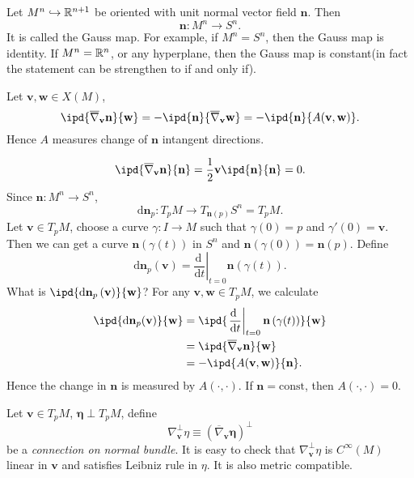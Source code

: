 \begin{example}
  Let $M^n\hookrightarrow \mathbb{R}^{n+1}$ be oriented with unit normal vector field $\mathbf{n}$. Then 
  \[
  \mathbf{n}:M^n\to S^n.
  \] 
  It is called the Gauss map. For example, if $M^n=S^n$,  then the Gauss map is identity. If $M^n=\mathbb{R}^n$, or any hyperplane, then the Gauss map is constant(in fact the statement can be strengthen to if and only if).

  Let $\mathbf{v},\mathbf{w}\in X(M)$,
  \[
    \ipd{\overline{\nabla }_{\mathbf{v}}\mathbf{n}}{\mathbf{w}}=-\ipd{\mathbf{n}}{\overline{\nabla }_{\mathbf{v}}\mathbf{w}}=-\ipd{\mathbf{n}}{A(\mathbf{v},\mathbf{w})}.
  \]
  Hence $A$ measures change of $\mathbf{n}$ intangent directions.

  \[
  \ipd{\overline{\nabla }_{\mathbf{v}}\mathbf{n}}{\mathbf{n}}=\frac{1}{2}\mathbf{v}\ipd{\mathbf{n}}{\mathbf{n}}=0.
  \]
Since $\mathbf{n}:M^n\to S^n$,
\[
  \mathrm{d}\mathbf{n}_p:T_pM\to T_{\mathbf{n}(p)}S^n= T_pM.
\]
Let $\mathbf{v}\in T_pM$, choose a curve $\gamma:I\to M$ such that $\gamma(0)=p$ and $\gamma'(0)=\mathbf{v}$. Then we can get a curve $\mathbf{n}\left( \gamma(t) \right) $ in $S^n$ and $\mathbf{n}(\gamma(0))=\mathbf{n}(p)$. Define
\[
  \mathrm{d}\mathbf{n}_p(\mathbf{v})=\left.\frac{\mathrm{d}~}{\mathrm{d}t}\right|_{t=0}\mathbf{n}\left( \gamma(t) \right) .
\] 
What is $\ipd{\mathrm{d}\mathbf{n}_p\left( \mathbf{v} \right) }{\mathbf{w}}$? For any $\mathbf{v},\mathbf{w}\in T_pM$, we calculate
\begin{align*}
  \ipd{\mathrm{d}\mathbf{n}_p(\mathbf{v})}{\mathbf{w}}&= \ipd{\left.\frac{\mathrm{d}~}{\mathrm{d}t}\right|_{t=0}\mathbf{n}\left( \gamma(t) \right) }{\mathbf{w}}\\
    &= \ipd{\overline{\nabla }_{\mathbf{v}}\mathbf{n}}{\mathbf{w}}\\
    &= -\ipd{A(\mathbf{v},\mathbf{w})}{\mathbf{n}}
.\end{align*}
Hence the change in $\mathbf{n}$ is measured by $A(\cdot ,\cdot )$. If $\mathbf{n}=\text{const}$, then $A(\cdot ,\cdot )=0$.
\end{example}

\begin{definition}
  Let $\mathbf{v}\in T_p M$, $\mathbf{\eta}\perp T_p M$, define 
  \begin{equation}
    \nabla _{\mathbf{v}}^{\perp}\eta\equiv \left( \overline{\nabla }_{\mathbf{v}}\mathbf{\eta} \right) ^{\perp}
  \end{equation}
  be a \textit{connection on normal bundle}. It is easy to check that  $\nabla _{\mathbf{v}}^{\perp}\eta$ is $C^\infty(M)$ linear in $\mathbf{v}$ and satisfies Leibniz rule in $\eta$. It is also metric compatible.
\end{definition}

